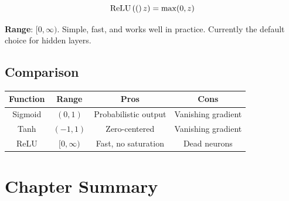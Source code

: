 \[
\text{ReLU}\left((\right)z) = \max(0, z)
\]

\textbf{Range}: $[0, \infty)$. Simple, fast, and works well in practice. Currently the default choice for hidden layers.

\subsection{Comparison}

\begin{center}
\begin{tabular}{|c|c|c|c|}
\hline
\textbf{Function} & \textbf{Range} & \textbf{Pros} & \textbf{Cons} \\ \hline
Sigmoid & $(0,1)$ & Probabilistic output & Vanishing gradient \\ \hline
Tanh & $(-1,1)$ & Zero-centered & Vanishing gradient \\ \hline
ReLU & $[0,\infty)$ & Fast, no saturation & Dead neurons \\ \hline
\end{tabular}
\end{center}


\section{Chapter Summary}

